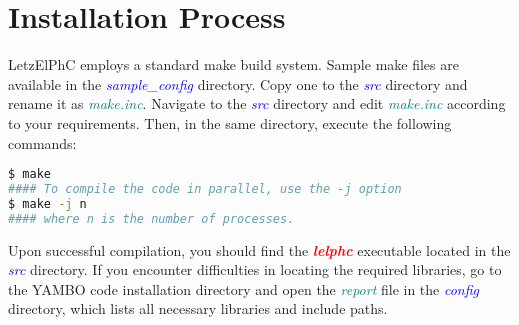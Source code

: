 \documentclass[12pt,twoside,openany]{book}
\begin{document}
\section{Installation Process}
LetzElPhC employs a standard make build system. Sample make files are available in the \textcolor{blue}{\emph{sample\_config}} directory. 
Copy one to the \textcolor{blue}{\emph{src}} directory and rename it as \textcolor{teal}{\emph{make.inc}}. 
Navigate to the \textcolor{blue}{\emph{src}} directory and edit \textcolor{teal}{\emph{make.inc}} according to your requirements. 
Then, in the same directory, execute the following commands:
\begin{lstlisting}[language=bash]
$ make
#### To compile the code in parallel, use the -j option
$ make -j n
#### where n is the number of processes.
\end{lstlisting}
Upon successful compilation, you should find the \textbf{\textcolor{red}{\emph{lelphc}}} executable located in the \textcolor{blue}{\emph{src}} directory.
If you encounter difficulties in locating the required libraries, go to the YAMBO code installation directory and 
open the \textcolor{teal}{\emph{report}} file in the \textcolor{blue}{\emph{config}} directory, which lists all necessary libraries and include paths.
\end{document}
